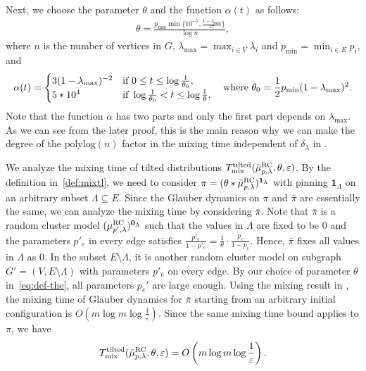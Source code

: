 \documentclass[11pt,a4paper]{article}
\renewcommand{\epsilon}{\varepsilon}
\newcommand{\mixtl}{T_{\textnormal{mix}}^{\textnormal{tilted}}}
\theoremstyle{definition}
\def\*#1{\mathbf{#1}} %
\begin{document}
Next, we choose the parameter $\theta$ and the function $\alpha(t)$ as follows:
\begin{align}\label{eq:def-the}
    \theta=\frac{p_{\min}\min \{10^{-7},\frac{1-\lambda_{\max}}{27}\} }{\log n},
 \end{align}
 where $n$ is the number of vertices in $G$, $\lambda_{\max}=\max_{i\in V}\lambda_i$ and $p_{\min}=\min_{i\in E}p_i$, and 
 \begin{align}\label{eq:alpha-t}
     \alpha(t)=\begin{cases}
         3(1-\lambda_{\max})^{-2} & \textnormal{if } 0\leq t \leq \log\frac{1}{\theta_0},\\
         5*10^4 & \textnormal{if } \log\frac{1}{\theta_0} < t\leq \log\frac{1}{\theta},
     \end{cases} \quad \text{where } \theta_0 = \frac{1}{2}p_{\min}(1-\lambda_{\max})^{2}.
 \end{align}
Note that the function $\alpha$ has two parts and only the first part depends on $\lambda_{\max}$. As we can see from the later proof, this is the main reason why we can make the degree of the  $\mathrm{polylog}(n)$ factor in the mixing time independent of $\delta_\lambda$ in .

We analyze the mixing time of tilted distributions $\mixtl(\bar{\mu}_{p,\lambda}^{\textnormal{RC}},\theta,\epsilon)$. By the definition in~\eqref{def:mixtl}, we need to consider $\pi = (\theta * \bar{\mu}_{p,\lambda}^{\textnormal{RC}})^{\*1_\Lambda}$ with pinning $\*1_\Lambda$ on an arbitrary subset $\Lambda\subseteq E$. Since the Glauber dynamics on $\pi$ and $\bar{\pi}$ are essentially the same, we can analyze the mixing time by considering $\bar{\pi}$.
Note that $\bar{\pi}$ is a random cluster model $(\mu_{p',\lambda}^{\textnormal{RC}})^{\*0_{\Lambda}}$ such that the values in $\Lambda$ are fixed to be 0 and the parameters $p'_e$ in every edge satisfies $\frac{p'_e}{1-p'_e} = \frac{1}{\theta} \cdot \frac{p_e}{1-p_e}$.
Hence, $\bar{\pi}$ fixes all values in $\Lambda$ as 0. In the subset $E \setminus \Lambda$, it is another random cluster model on subgraph $G' = (V, E \setminus \Lambda)$ with parameters $p'_e$ on every edge.
By our choice of parameter $\theta$ in~\eqref{eq:def-the}, all parameters $p_e'$ are large enough. Using the mixing result in \cite[Lem. 3.8]{CZ23}, the mixing time of Glauber dynamics for $\bar{\pi}$ starting from an arbitrary initial configuration is $O(m \log m \log \frac{1}{\epsilon})$. Since the same mixing time bound applies to $\pi$, we have
 \begin{align}\label{eq:mixtl-rc}
    \mixtl(\bar{\mu}_{p,\lambda}^{\textnormal{RC}},\theta,\epsilon) = O\left(m \log m \log \frac{1}{\epsilon}\right).
\end{align}
\end{document}
